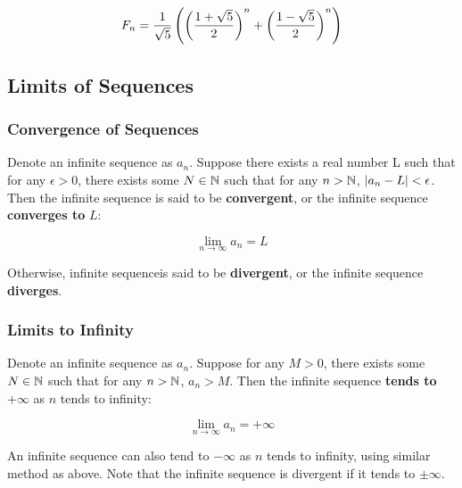 \documentclass[a4paper,12pt]{article}
\begin{document}
$$F_{n}=\frac{1}{\sqrt{5}}\left( \left( \frac{1+\sqrt{5}}{2}\right)^{n}+\left( \frac{1-\sqrt{5}}{2}\right)^{n}\right)$$

\subsection{Limits of Sequences}
\subsubsection{Convergence of Sequences}
\begin{dft}
  Denote an infinite sequence as $a_{n}$. Suppose there exists a real number L such that for any $\epsilon>0$, there exists some $N\in\mathbb{N}$ such that for any $n>\mathbb{N}$, $\left| a_{n}-L\right|<\epsilon$. Then the infinite sequence is said to be \textbf{convergent}, or the infinite sequence \textbf{converges to} $L$:

  $$\lim_{n\to \infty}a_{n}=L$$\s

  Otherwise, infinite sequenceis said to be \textbf{divergent}, or the infinite sequence \textbf{diverges}.
\end{dft}

\subsubsection{Limits to Infinity}
\begin{dft}
  Denote an infinite sequence as $a_{n}$. Suppose for any $M>0$, there exists some $N\in\mathbb{N}$ such that for any $n>\mathbb{N}$, $a_{n}>M$. Then the infinite sequence \textbf{tends to} $+\infty$ as $n$ tends to infinity:

  $$\lim_{n\to \infty}a_{n}=+\infty$$
\end{dft}\n

An infinite sequence can also tend to $-\infty$ as $n$ tends to infinity, using similar method as above. Note that the infinite sequence is divergent if it tends to $\pm \infty$.
\end{document}
